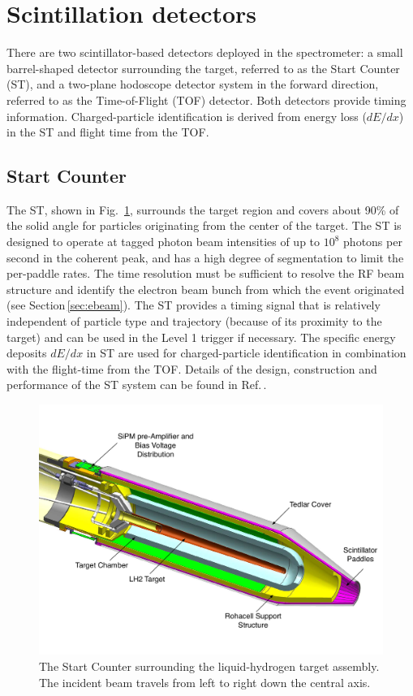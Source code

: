 \section[Scintillation detectors]{Scintillation detectors \label{sec:scintillators}}
There are two scintillator-based detectors deployed in the \gx{} spectrometer: a small barrel-shaped detector surrounding the
target, referred to as the Start Counter (ST), and a two-plane hodoscope detector system in the forward direction, referred to as the
Time-of-Flight (TOF) detector. Both detectors provide timing information. Charged-particle identification is derived from
energy loss ($dE/dx$) in the ST and flight time from the TOF.

\subsection{Start Counter \label{sec:st}}

The ST, shown in Fig.~\ref{fig:st-overview-drawing},
surrounds the target
region and covers about 90\% of the solid angle for particles
originating from the center of the target. The ST is designed to operate
at tagged photon beam intensities of up to $10^8$ photons per second
in the coherent peak, and has a high degree of segmentation to limit
the per-paddle rates. The time resolution must be sufficient to resolve the RF beam structure and identify the electron beam bunch from which the event originated
(see Section\,\ref{sec:ebeam}). The ST provides a timing signal that is relatively independent of particle type and trajectory (because of its proximity to the target) and can be used in the Level 1 trigger if necessary. The specific energy deposits $dE/dx$ in ST are used for charged-particle identification in combination with the flight-time from the TOF.
Details of the design, construction and performance of the ST system can be found in 
Ref.\,\cite{Pooser:2019rhu}.

\begin{figure}[!htb]
\centering
\includegraphics[width=1.0\columnwidth]{figures/start_counter_all.pdf}
\caption{The \gx{} Start Counter surrounding the liquid-hydrogen
  target assembly.  The incident beam travels from left to right down the central
  axis.\label{fig:st-overview-drawing}}
\end{figure}

